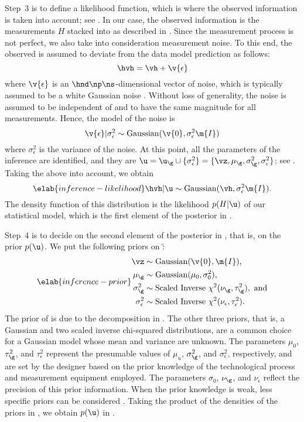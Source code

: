 Step~3 is to define a likelihood function, which is where the observed
information is taken into account; see . In our case,
the observed information is the measurements $H$ stacked into \hvh as described
in . Since the measurement process is not perfect, we
also take into consideration measurement noise. To this end, the observed \hvh
is assumed to deviate from the data model prediction \vh as follows:
\[
  \hvh = \vh + \v{\epsilon}
\]
where $\v{\epsilon}$ is an $\hnd \np \ns$-dimensional vector of noise, which is
typically assumed to be a white Gaussian noise \cite{rasmussen2006,
marzouk2009}. Without loss of generality, the noise is assumed to be independent
of \g and to have the same magnitude for all measurements. Hence, the model of
the noise is
\[
  \v{\epsilon} | \sigma^2_\epsilon \sim \mathrm{Gaussian}(\v{0}, \sigma^2_\epsilon \m{I})
\]
where $\sigma^2_\epsilon$ is the variance of the noise. At this point, all the
parameters of the inference are identified, and they are $\u = \u_\g \cup \{
\sigma_\epsilon^2 \} = \{ \vz, \mu_\g, \sigma_\g^2, \sigma_\epsilon^2 \}$; see
. Taking the above into account, we obtain
\begin{equation} \elab{inference-likelihood}
  \hvh | \u \sim \mathrm{Gaussian}(\vh, \sigma_\epsilon^2 \m{I}).
\end{equation}
The density function of this distribution is the likelihood $p(H | \u)$ of our
statistical model, which is the first element of the posterior in
.

Step~4 is to decide on the second element of the posterior in
, that is, on the prior $p(\u)$. We put the following priors
on \u:
\begin{align} \elab{inference-prior}
  \begin{split}
    \vz               & \sim \mathrm{Gaussian}(\v{0}, \m{I}), \\
    \mu_\g            & \sim \mathrm{Gaussian}(\mu_0, \sigma^2_0), \\
    \sigma^2_\g       & \sim \mathrm{Scaled\ Inverse\ } \chi^2(\nu_\g, \tau^2_\g), \text{ and} \\
    \sigma^2_\epsilon & \sim \mathrm{Scaled\ Inverse\ } \chi^2(\nu_\epsilon, \tau^2_\epsilon).
  \end{split}
\end{align}
The prior of \vz is due to the decomposition in . The
other three priors, that is, a Gaussian and two scaled inverse chi-squared
distributions, are a common choice for a Gaussian model whose mean and variance
are unknown. The parameters $\mu_0$, $\tau^2_\g$, and $\tau^2_\epsilon$
represent the presumable values of $\mu_u$, $\sigma^2_\g$, and
$\sigma^2_\epsilon$, respectively, and are set by the designer based on the
prior knowledge of the technological process and measurement equipment employed.
The parameters $\sigma_0$, $\nu_\g$, and $\nu_\epsilon$ reflect the precision of
this prior information. When the prior knowledge is weak, less specific priors
can be considered \cite{gelman2013}. Taking the product of the densities of the
priors in , we obtain $p(\u)$ in .

